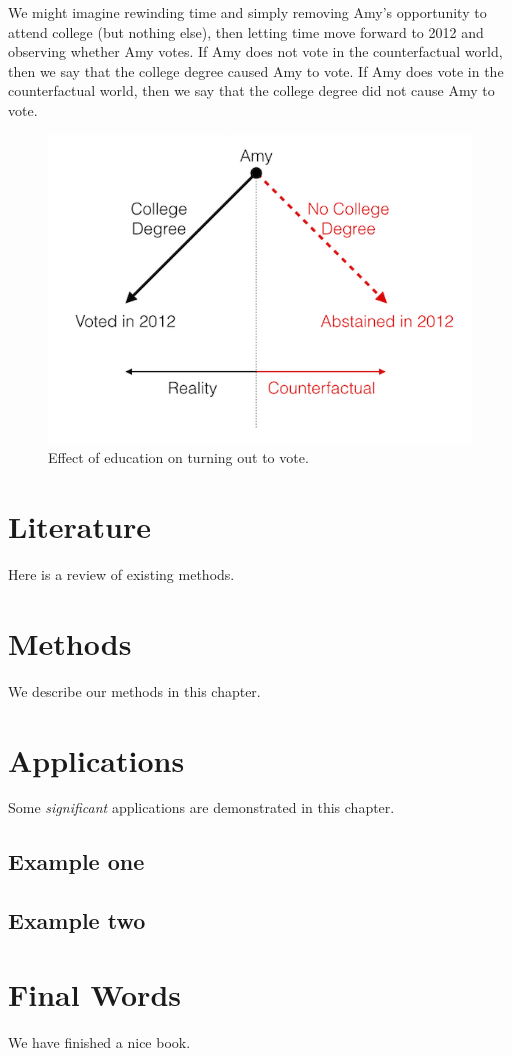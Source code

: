 \documentclass[]{book}
\theoremstyle{definition}
\theoremstyle{definition}
\theoremstyle{definition}
\theoremstyle{remark}
\begin{document}
We might imagine rewinding time and simply removing Amy's opportunity to
attend college (but nothing else), then letting time move forward to
2012 and observing whether Amy votes. If Amy does not vote in the
counterfactual world, then we say that the college degree caused Amy to
vote. If Amy does vote in the counterfactual world, then we say that the
college degree did not cause Amy to vote.

\begin{figure}
\centering
\includegraphics{diagrams/cf-amy.png}
\caption{Effect of education on turning out to vote.}
\end{figure}

\chapter{Literature}\label{literature}

Here is a review of existing methods.

\chapter{Methods}\label{methods}

We describe our methods in this chapter.

\chapter{Applications}\label{applications}

Some \emph{significant} applications are demonstrated in this chapter.

\section{Example one}\label{example-one}

\section{Example two}\label{example-two}

\chapter{Final Words}\label{final-words}

We have finished a nice book.


\end{document}

